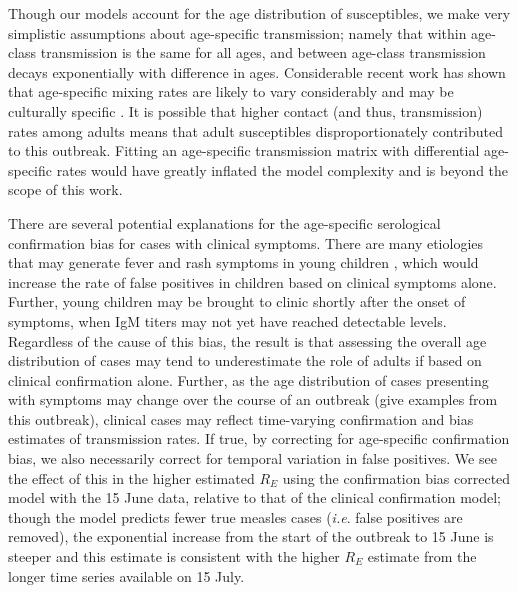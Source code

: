 Though our models account for the age distribution of susceptibles, we make very simplistic assumptions about age-specific transmission; namely that
within age-class transmission is the same for all ages, and between age-class transmission decays exponentially with difference in ages. Considerable recent work has shown that age-specific mixing rates are likely to vary considerably and may be culturally specific \cite{Mossong_2008}. It is possible that higher contact (and thus, transmission) rates among adults means that adult susceptibles disproportionately contributed to this outbreak. Fitting an age-specific transmission matrix with differential age-specific rates would have greatly inflated the model complexity and is beyond the scope of this work. \cite{327793}

There are several potential explanations for the age-specific serological confirmation bias for cases with clinical symptoms. There are many
etiologies that may generate fever and rash symptoms in young children  \cite{Hutchins_2004,Ho_2014,GUY_2004,31c964}, which would increase the rate of false
positives in children based on clinical symptoms alone. Further, young children may be brought to clinic shortly after the onset of symptoms,
when IgM titers may not yet have reached detectable levels. Regardless of the cause of this bias, the result is that assessing the
overall age distribution of cases may tend to underestimate the role of adults if based on clinical confirmation alone. Further, as the age
distribution of cases presenting with symptoms may change over the course of an outbreak (give examples from this outbreak), clinical cases
may reflect time-varying confirmation and bias estimates of transmission rates. If true, by correcting for age-specific confirmation bias, we also
necessarily correct for temporal variation in false positives. We see the effect of this in the higher estimated \(R_E\) using the confirmation
bias corrected model with the 15 June data, relative to that of the clinical confirmation model; though the model predicts fewer true measles cases (\emph{i.e}. false positives are removed), the exponential increase from the start of the outbreak to 15 June is steeper and this estimate is consistent with the higher \(R_E\) estimate from the longer time series available on 15 July.

